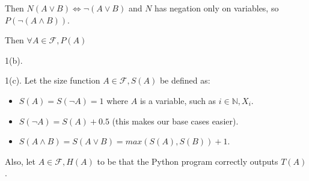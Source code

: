 \documentclass{article}
\begin{document}
\begin{itemize}
\begin{description}
\begin{description}
\begin{description}
\begin{description}
                \item Then $N(A \lor B) \Leftrightarrow \neg(A \lor B)$ and $N$ has negation only on variables, so $P(\neg(A \land B))$.
                \end{description}
            \end{description}
        \end{description}
    \item Then $\forall A \in \mathcal{F}, P(A)$
    \end{description}
\item 1(b).
    
\item 1(c). Let the size function $A \in \mathcal{F}, S(A)$ be defined as:
    \begin{itemize}
    \item $S(A) = S(\neg A) = 1$ where $A$ is a variable, such as $i \in \mathbb{N}, X_i$.
    \item $S(\neg A) = S(A) + 0.5$ (this makes our base cases easier).
    \item $S(A \land B) = S(A \lor B) = max(S(A), S(B)) + 1$.
    \end{itemize}

    Also, let $A \in \mathcal{F}, H(A)$ to be that the Python program correctly outputs $T(A)$.


\end{itemize}
\end{document}
